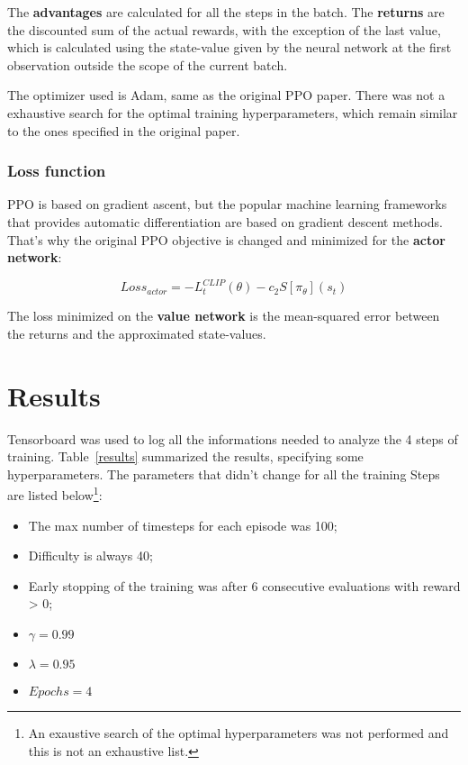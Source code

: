 \documentclass{article}
\begin{document}
The \textbf{advantages} are calculated for all the steps in the batch. The \textbf{returns} are the discounted sum of the actual rewards, with the exception of the last value, which is calculated using the state-value given by the neural network at the first observation outside the scope of the current batch.

The optimizer used is Adam, same as the original PPO paper. There was not a exhaustive search for the optimal training hyperparameters, which remain similar to the ones specified in the original paper.

\subsubsection{Loss function}
PPO is based on gradient ascent, but the popular machine learning frameworks that provides automatic differentiation are based on gradient descent methods. That's why the original PPO objective is changed and minimized for the \textbf{actor network}:

\begin{displaymath}
    Loss_{actor} = -L_t^{CLIP}(\theta) - c_2 S[\pi_\theta](s_t)
\end{displaymath}

The loss minimized on the \textbf{value network} is the mean-squared error between the returns and the approximated state-values.

\section{Results}
Tensorboard was used to log all the informations needed to analyze the 4 steps of training. Table~\ref{results} summarized the results, specifying some hyperparameters. The parameters that didn't change for all the training Steps are listed below\footnote{An exaustive search of the optimal hyperparameters was not performed and this is not an exhaustive list.}:

\begin{itemize}
    \item The max number of timesteps for each episode was 100;
    \item Difficulty is always 40;
    \item Early stopping of the training was after 6 consecutive evaluations with reward > 0;
    \item \(\gamma = 0.99\)
    \item \(\lambda = 0.95\)
    \item \(Epochs = 4\)
\end{itemize}
\end{document}
